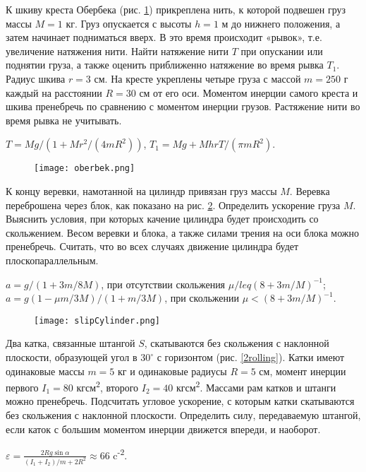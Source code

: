\begin{ex} %
К шкиву креста Обербека (рис. \ref{oberbek}) прикреплена нить, к которой подвешен груз массы $M = 1$ кг. Груз опускается с высоты $h = 1$ м до нижнего положения, а затем начинает подниматься вверх. В это время происходит «рывок», т.е. увеличение натяжения нити. Найти натяжение нити $T$ при опускании или поднятии груза, а также оценить приближенно натяжение во время рывка $T_1$. Радиус шкива $r = 3$ см. На кресте укреплены четыре груза с массой $m = 250$ г каждый на расстоянии $R = 30$ см от его оси. Моментом инерции самого креста и шкива пренебречь по сравнению с моментом инерции грузов. Растяжение нити во время рывка не учитывать.
\begin{ans}
$T = Mg/(1 + Mr^2/(4mR^2))$, $T_1 = Mg + MhrT/(\pi m R^2)$.
\end{ans}
\end{ex}	

\begin{figure}[h]
\centering
\texttt{[image: oberbek.png]}
\caption{}
\label{oberbek}
\end{figure}

\complexProblems

\begin{ex} %
К концу веревки, намотанной на цилиндр привязан груз массы $M$. Веревка переброшена через блок, как показано на рис. \ref{slipCylinder}. Определить ускорение груза $M$. Выяснить условия, при которых качение цилиндра будет происходить со скольжением. Весом веревки и блока, а также силами трения на оси блока можно пренебречь. Считать, что во всех случаях движение цилиндра будет плоскопараллельным.
\begin{ans}
$a = g/(1+3m/8M)$, при отсутствии скольжения $\mu /leq (8+3m/M)^{-1}$; $a = g(1 - \mu m/3M)/(1+m/3M)$, при скольжении $\mu < (8+3m/M)^{-1}$.
\end{ans}
\end{ex}	

\begin{figure}[h]
\centering
\texttt{[image: slipCylinder.png]}
\caption{}
\label{slipCylinder}
\end{figure}

\begin{ex} %
Два катка, связанные штангой $S$, скатываются без скольжения с наклонной плоскости, образующей угол в $30^{\circ}$ с горизонтом (рис. \ref{2rolling}). Катки имеют одинаковые массы $m = 5$ кг и одинаковые радиусы $R = 5$ см, момент инерции первого $I_1 = 80$ кгсм\textsuperscript{2}, второго $I_2 = 40$ кгсм\textsuperscript{2}. Массами рам катков и штанги можно пренебречь. Подсчитать угловое ускорение, с которым катки скатываются без скольжения с наклонной плоскости. Определить силу, передаваемую штангой, если каток с большим моментом инерции движется впереди, и наоборот.
\begin{ans}
$\varepsilon = \frac{2Rg \sin \alpha}{(I_1 + I_2)/m + 2R^2} \approx 66$ c\textsuperscript{-2}.
\end{ans}
\end{ex}	

